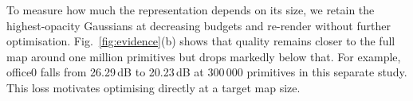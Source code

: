 To measure how much the representation depends on its size, we retain the
highest-opacity Gaussians at decreasing budgets and re-render without further
optimisation. Fig.~\ref{fig:evidence}(b) shows that quality remains closer to
the full map around one million primitives but drops markedly below that.
For example, office0 falls from 26.29\,dB to 20.23\,dB at 300\,000
primitives in this separate study. This loss motivates optimising directly
at a target map size.
